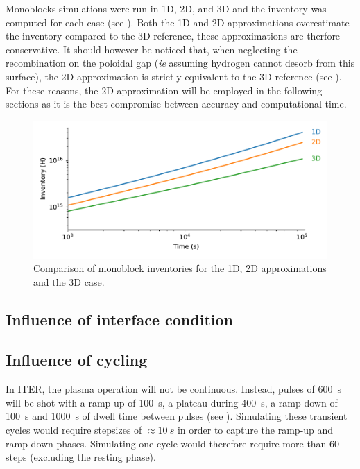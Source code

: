 Monoblocks simulations were run in 1D, 2D, and 3D and the inventory was computed for each case (see ).
Both the 1D and 2D approximations overestimate the inventory compared to the 3D reference, these approximations are therfore conservative.
It should however be noticed that, when neglecting the recombination on the poloidal gap (\textit{ie} assuming hydrogen cannot desorb from this surface), the 2D approximation is strictly equivalent to the 3D reference (see ).
For these reasons, the 2D approximation will be employed in the following sections as it is the best compromise between accuracy and computational time.

\begin{figure}
    \centering
    \includegraphics[width=\linewidth]{Figures/Chapter3/monoblocks/3D_monoblocks/comparison_inventory_1d_2d_3d.pdf}
    \caption{Comparison of monoblock inventories for the 1D, 2D approximations and the 3D case.}
\end{figure}

\subsection{Influence of interface condition}


\subsection{Influence of cycling}

In ITER, the plasma operation will not be continuous.
Instead, pulses of \SI{600}{s} will be shot  with a ramp-up of \SI{100}{s}, a plateau during \SI{400}{s}, a ramp-down of \SI{100}{s} and \SI{1000}{s} of dwell time between pulses (see ).
Simulating these transient cycles would require stepsizes of $\approx \SI{10}{s}$ in order to capture the ramp-up and ramp-down phases.
Simulating one cycle would therefore require more than 60 steps (excluding the resting phase).

